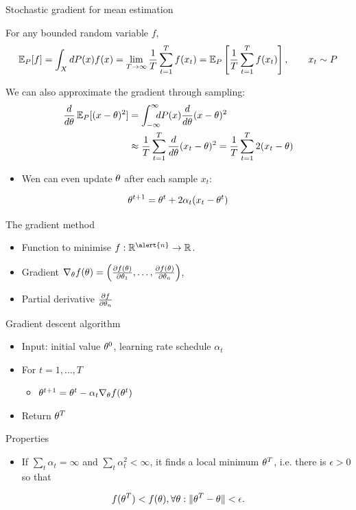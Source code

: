 \documentclass[smaller]{beamer}
\begin{document}
\begin{frame}[label={sec:org2efaf6c}]{Stochastic gradient for mean estimation}
\begin{theorem}[Sampling]
For any bounded random variable \(f\), 
\[
\mathop{\mbox{\ensuremath{\mathbb{E}}}}\nolimits_P[f] = \int_{X} dP(x) f(x)
 = 
\lim_{T \to \infty} \frac{1}{T} \sum_{t=1}^T f(x_t)
 = 
\mathop{\mbox{\ensuremath{\mathbb{E}}}}\nolimits_P \left[\frac{1}{T} \sum_{t=1}^T f(x_t)\right]
, \qquad x_t \sim P
\]
\end{theorem}
\begin{example}
We can also approximate the gradient through sampling:
\begin{align*}
 \frac{d}{d\theta} \mathop{\mbox{\ensuremath{\mathbb{E}}}}\nolimits_P [(x - \theta)^2] 
&= \int_{-\infty}^\infty \!\!\!\! dP(x) \frac{d}{d\theta} (x - \theta)^2
\\
&\approx \frac{1}{T} \sum_{t=1}^T \frac{d}{d\theta} (x_t - \theta)^2
= \frac{1}{T} \sum_{t=1}^T 2(x_t - \theta)
\end{align*}
\pause
\begin{itemize}
\item Wen can even update \(\theta\) after \alert{each sample} \(x_t\):
\end{itemize}
\[
\theta^{t+1} = \theta^t + 2 \alpha_t (x_t - \theta^t)
\]
\end{example}
\end{frame}
\begin{frame}[label={sec:org9a24200}]{The gradient method}
\begin{itemize}
\item Function to minimise \(f : \Reals^{\alert{n}} \to \Reals\).
\item \alert{Gradient} \(\nabla_\theta f(\theta)  = \left(\frac{\partial f(\theta)}{\partial \theta_1}, \ldots, \frac{\partial f(\theta)}{\partial \theta_n}\right)\),
\item \alert{Partial} derivative \(\frac{\partial f}{\partial \theta_n}\)
\end{itemize}
\pause
\begin{block}{Gradient descent algorithm}
\begin{itemize}
\item Input: initial value \(\theta^0\), learning rate schedule \(\alpha_t\)
\item For \(t=1, \ldots, T\)
\begin{itemize}
\item \(\theta^{t+1} = \theta^t - \alpha_t \nabla_\theta f(\theta^t)\)
\end{itemize}
\item Return \(\theta^T\)
\end{itemize}
\pause
\end{block}
\begin{block}{Properties}
\begin{itemize}
\item If \(\sum_t \alpha_t = \infty\) and \(\sum_t \alpha_t^2 < \infty\), it finds a local minimum \(\theta^T\), i.e. there is \(\epsilon > 0\) so that
\end{itemize}
\[
f(\theta^T) < f(\theta), \forall \theta: \|\theta^T - \theta\| < \epsilon.
\]
\end{block}
\end{frame}
\end{document}
